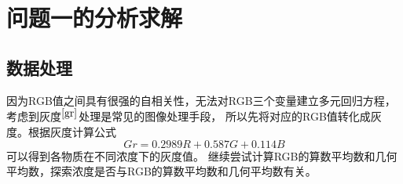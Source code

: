 \section{问题一的分析求解}
\subsection{数据处理}
        因为RGB值之间具有很强的自相关性，无法对RGB三个变量建立多元回归方程，考虑到灰度$^{\cite{gr}}$处理是常见的图像处理手段，
        所以先将对应的RGB值转化成灰度。根据灰度计算公式
        $$Gr = 0.2989R + 0.587G + 0.114B$$
        可以得到各物质在不同浓度下的灰度值。
        继续尝试计算RGB的算数平均数和几何平均数，探索浓度是否与RGB的算数平均数和几何平均数有关。
